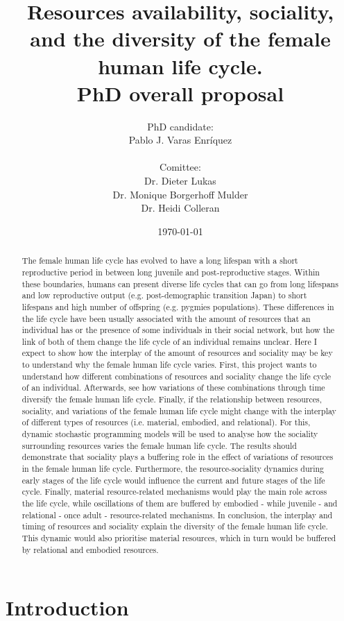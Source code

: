 \documentclass{article}
\title{
Resources availability, sociality, and the diversity of the female human life cycle.\\
PhD overall proposal}
\author{PhD candidate:\\
Pablo J. Varas Enríquez\\\\
Comittee:\\
Dr. Dieter Lukas\\
Dr. Monique Borgerhoff Mulder\\
Dr. Heidi Colleran}
\date{\today}
\begin{document}
\maketitle

\tableofcontents

\begin{abstract}
    The female human life cycle has evolved to have a long lifespan with a short reproductive period in between long juvenile and post-reproductive stages. Within these boundaries, humans can present diverse life cycles that can go from long lifespans and low reproductive output (e.g. post-demographic transition Japan) to short lifespans and high number of offspring (e.g. pygmies populations). These differences in the life cycle have been usually associated with the amount of resources that an individual has or the presence of some individuals in their social network, but how the link of both of them change the life cycle of an individual remains unclear. Here I expect to show how the interplay of the amount of resources and sociality may be key to understand why the female human life cycle varies. First, this project wants to understand how different combinations of resources and sociality change the life cycle of an individual. Afterwards, see how variations of these combinations through time diversify the female human life cycle. Finally, if the relationship between resources, sociality, and variations of the female human life cycle might change with the interplay of different types of resources (i.e. material, embodied, and relational). For this, dynamic stochastic programming models will be used to analyse how the sociality surrounding resources varies the female human life cycle. The results should demonstrate that sociality plays a buffering role in the effect of variations of resources in the female human life cycle. Furthermore, the resource-sociality dynamics during early stages of the life cycle would influence the current and future stages of the life cycle. Finally, material resource-related mechanisms would play the main role across the life cycle, while oscillations of them are buffered by embodied - while juvenile - and relational - once adult - resource-related mechanisms. In conclusion, the interplay and timing of resources and sociality explain the diversity of the female human life cycle. This dynamic would also prioritise material resources, which in turn would be buffered by relational and embodied resources.
\end{abstract}

\section{Introduction}
\end{document}
